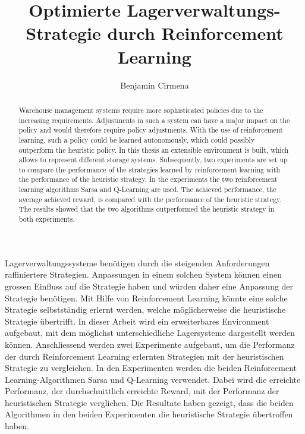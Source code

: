 \documentclass{ffhsthesis}
\begin{document}
\title{Optimierte Lagerverwaltungs-Strategie durch Reinforcement Learning}
\author{Benjamin Cirmena}


\maketitle


\begin{zusammenfassung}
Lagerverwaltungssysteme benötigen durch die steigenden Anforderungen raffiniertere Strategien. Anpassungen in einem solchen System können einen grossen Einfluss auf die Strategie haben und würden daher eine Anpassung der Strategie benötigen. Mit Hilfe von Reinforcement Learning könnte eine solche Strategie selbstständig erlernt werden, welche möglicherweise die heuristische Strategie übertrifft.
In dieser Arbeit wird ein erweiterbares Environment aufgebaut, mit dem möglichst unterschiedliche Lagersysteme dargestellt werden können. Anschliessend werden zwei Experimente aufgebaut, um die Performanz der durch Reinforcement Learning erlernten Strategien mit der heuristischen Strategie zu vergleichen. In den Experimenten werden die beiden Reinforcement Learning-Algorithmen Sarsa und Q-Learning verwendet. Dabei wird die erreichte Performanz, der durchschnittlich erreichte Reward, mit der Performanz der heuristischen Strategie verglichen. Die Resultate haben gezeigt, dass die beiden Algorithmen in den beiden Experimenten die heuristische Strategie übertroffen haben.
\end{zusammenfassung}
\newpage
\begin{abstract}
Warehouse management systems require more sophisticated policies due to the increasing requirements. Adjustments in such a system can have a major impact on the policy and would therefore require policy adjustments. With the use of reinforcement learning, such a policy could be learned autonomously, which could possibly outperform the heuristic policy.
In this thesis an extensible environment is built, which allows to represent different storage systems. Subsequently, two experiments are set up to compare the performance of the strategies learned by reinforcement learning with the performance of the heuristic strategy. In the experiments the two reinforcement learning algorithms Sarsa and Q-Learning are used. The achieved performance, the average achieved reward, is compared with the performance of the heuristic strategy. The results showed that the two algorithms outperformed the heuristic strategy in both experiments.
\end{abstract}
\end{document}
